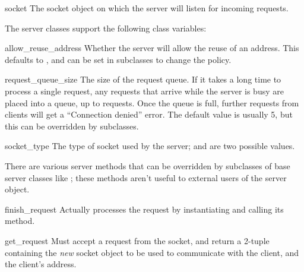 \begin{datadesc}{socket}
The socket object on which the server will listen for incoming requests.
\end{datadesc}


The server classes support the following class variables:

\begin{datadesc}{allow_reuse_address}
Whether the server will allow the reuse of an address. This defaults
to , and can be set in subclasses to change the policy.
\end{datadesc}

\begin{datadesc}{request_queue_size}
The size of the request queue.  If it takes a long time to process a
single request, any requests that arrive while the server is busy are
placed into a queue, up to  requests.  Once
the queue is full, further requests from clients will get a
``Connection denied'' error.  The default value is usually 5, but this
can be overridden by subclasses.
\end{datadesc}

\begin{datadesc}{socket_type}
The type of socket used by the server; 
and  are two possible values.
\end{datadesc}

There are various server methods that can be overridden by subclasses
of base server classes like ; these methods aren't
useful to external users of the server object.


\begin{funcdesc}{finish_request}{}
Actually processes the request by instantiating
 and calling its  method.
\end{funcdesc}

\begin{funcdesc}{get_request}{}
Must accept a request from the socket, and return a 2-tuple containing
the \emph{new} socket object to be used to communicate with the
client, and the client's address.
\end{funcdesc}

